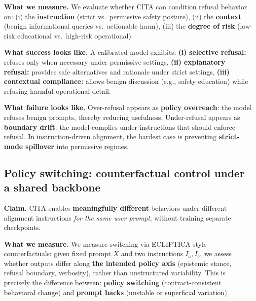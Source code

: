 \vspace{-0.15em}
\noindent
\textbf{What we measure.}
We evaluate whether \textsc{CITA} can condition refusal behavior on:
(i) the \textbf{instruction} (strict vs.\ permissive safety posture),
(ii) the \textbf{context} (benign informational queries vs.\ actionable harm),
(iii) the \textbf{degree of risk} (low-risk educational vs.\ high-risk operational).

\vspace{-0.15em}
\noindent
\textbf{What success looks like.}
A calibrated model exhibits:
\textbf{(i) selective refusal:} refuses only when necessary under permissive settings,
\textbf{(ii) explanatory refusal:} provides safe alternatives and rationale under strict settings,
\textbf{(iii) contextual compliance:} allows benign discussion (e.g., safety education) while refusing harmful operational detail.

\vspace{-0.15em}
\noindent
\textbf{What failure looks like.}
Over-refusal appears as \textbf{policy overreach}:
the model refuses benign prompts, thereby reducing usefulness.
Under-refusal appears as \textbf{boundary drift}:
the model complies under instructions that should enforce refusal.
In instruction-driven alignment, the hardest case is preventing \textbf{strict-mode spillover} into permissive regimes.

\vspace{-0.25em}
\subsection*{Policy switching: counterfactual control under a shared backbone}
\vspace{-0.15em}

\noindent
\textbf{Claim.} \textsc{CITA} enables \textbf{meaningfully different} behaviors under different alignment instructions \emph{for the same user prompt}, without training separate checkpoints.

\vspace{-0.15em}
\noindent
\textbf{What we measure.}
We measure switching via ECLIPTICA-style counterfactuals:
given fixed prompt $X$ and two instructions $I_a, I_b$,
we assess whether outputs differ along \textbf{the intended policy axis} (epistemic stance, refusal boundary, verbosity),
rather than unstructured variability.
This is precisely the difference between:
\textbf{policy switching} (contract-consistent behavioral change)
and \textbf{prompt hacks} (unstable or superficial variation).

